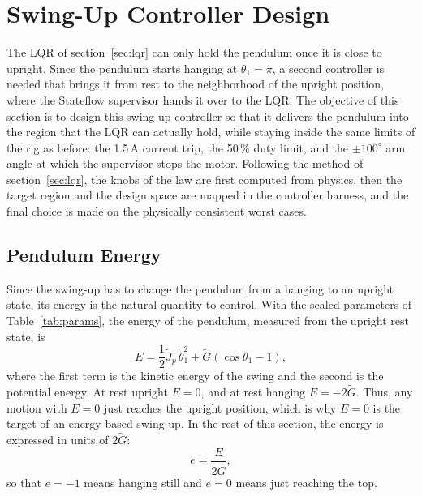 \documentclass[a4paper,11pt]{article}
\begin{document}
\section{Swing-Up Controller Design}
\label{sec:swingup}
The LQR of section~\ref{sec:lqr} can only hold the pendulum once it is close to upright. Since the pendulum starts hanging at $\theta_1 = \pi$, a second controller is needed that brings it from rest to the neighborhood of the upright position, where the Stateflow supervisor hands it over to the LQR. The objective of this section is to design this swing-up controller so that it delivers the pendulum into the region that the LQR can actually hold, while staying inside the same limits of the rig as before: the 1.5\,A current trip, the 50\,\% duty limit, and the $\pm 100^\circ$ arm angle at which the supervisor stops the motor. Following the method of section~\ref{sec:lqr}, the knobs of the law are first computed from physics, then the target region and the design space are mapped in the controller harness, and the final choice is made on the physically consistent worst cases.

\subsection{Pendulum Energy}
\label{sec:su_energy}
Since the swing-up has to change the pendulum from a hanging to an upright state, its energy is the natural quantity to control. With the scaled parameters of Table~\ref{tab:params}, the energy of the pendulum, measured from the upright rest state, is
\begin{equation}
  E = \frac{1}{2}\tilde J_p\, \dot\theta_1^2 + \tilde G \left(\cos\theta_1 - 1\right),
  \label{eq:su_E}
\end{equation}
where the first term is the kinetic energy of the swing and the second is the potential energy. At rest upright $E = 0$, and at rest hanging $E = -2\tilde G$. Thus, any motion with $E = 0$ just reaches the upright position, which is why $E = 0$ is the target of an energy-based swing-up. In the rest of this section, the energy is expressed in units of $2\tilde G$:
\begin{equation}
  e = \frac{E}{2\tilde G},
  \label{eq:su_e}
\end{equation}
so that $e = -1$ means hanging still and $e = 0$ means just reaching the top.
\end{document}
